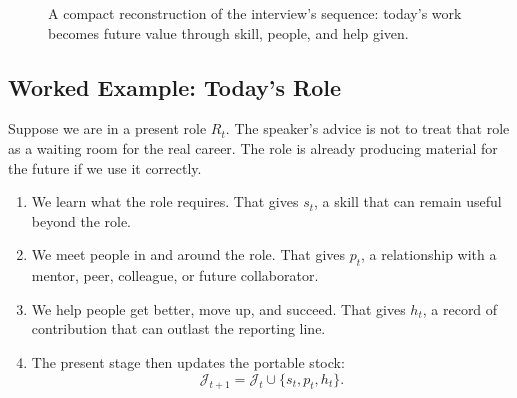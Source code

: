 \begin{figure}
\centering
{}
\caption{A compact reconstruction of the interview's sequence: today's work becomes future value through skill, people, and help given.}
\end{figure}

\subsection{Worked Example: Today's Role}

Suppose we are in a present role \(R_t\). The speaker's advice is not to treat that role as a waiting room for the real career. The role is already producing material for the future if we use it correctly.

\begin{enumerate}
\item We learn what the role requires. That gives \(s_t\), a skill that can remain useful beyond the role.
\item We meet people in and around the role. That gives \(p_t\), a relationship with a mentor, peer, colleague, or future collaborator.
\item We help people get better, move up, and succeed. That gives \(h_t\), a record of contribution that can outlast the reporting line.
\item The present stage then updates the portable stock:
\begin{equation}
\mathcal{J}_{t+1}
=
\mathcal{J}_t \cup \{s_t,p_t,h_t\}.
\end{equation}
\end{enumerate}

